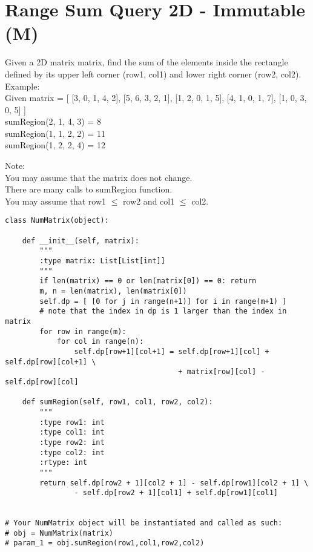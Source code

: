 \section{Range Sum Query 2D - Immutable (M)}
Given a 2D matrix matrix, find the sum of the elements inside the rectangle defined by its upper left corner (row1, col1) and lower right corner (row2, col2). \\

Example:\\
Given matrix = [
  [3, 0, 1, 4, 2], 
  [5, 6, 3, 2, 1], 
  [1, 2, 0, 1, 5], 
  [4, 1, 0, 1, 7], 
  [1, 0, 3, 0, 5] 
]\\
sumRegion(2, 1, 4, 3) = 8\\
sumRegion(1, 1, 2, 2) = 11\\
sumRegion(1, 2, 2, 4) = 12\

Note:\\
    You may assume that the matrix does not change.\\
    There are many calls to sumRegion function.\\
    You may assume that row1 $\leq$ row2 and col1 $\leq$ col2.\\

\begin{lstlisting}
class NumMatrix(object):

    def __init__(self, matrix):
        """
        :type matrix: List[List[int]]
        """
        if len(matrix) == 0 or len(matrix[0]) == 0: return
        m, n = len(matrix), len(matrix[0])
        self.dp = [ [0 for j in range(n+1)] for i in range(m+1) ]
        # note that the index in dp is 1 larger than the index in matrix
        for row in range(m):
            for col in range(n):
                self.dp[row+1][col+1] = self.dp[row+1][col] + self.dp[row][col+1] \
                                        + matrix[row][col] - self.dp[row][col]

    def sumRegion(self, row1, col1, row2, col2):
        """
        :type row1: int
        :type col1: int
        :type row2: int
        :type col2: int
        :rtype: int
        """
        return self.dp[row2 + 1][col2 + 1] - self.dp[row1][col2 + 1] \
                - self.dp[row2 + 1][col1] + self.dp[row1][col1]       


# Your NumMatrix object will be instantiated and called as such:
# obj = NumMatrix(matrix)
# param_1 = obj.sumRegion(row1,col1,row2,col2)
\end{lstlisting}


